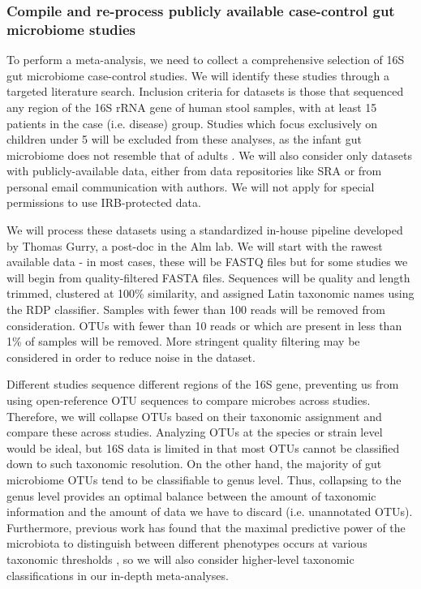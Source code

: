 \documentclass[12pt]{article}
\begin{document}
\subsubsection{Compile and re-process publicly available case-control gut microbiome studies}
To perform a meta-analysis, we need to collect a 
comprehensive selection of 16S gut microbiome case-control studies. We 
will identify these studies through a targeted literature search.  
Inclusion criteria for datasets is those that sequenced
any region of the 16S rRNA gene of human stool samples, with at least 15 patients in the
case (i.e. disease) group. Studies which focus exclusively on 
children under 5 will be excluded from these analyses, as the infant
gut microbiome does not resemble that of adults \cite{lozupone-meta-2013}.
We will also consider only datasets with 
publicly-available data, either from data repositories like SRA or
from personal email communication with authors. We will not 
apply for special permissions to use IRB-protected data. 

We will process these datasets using a standardized in-house pipeline 
developed by Thomas Gurry, a post-doc in the Alm lab. We will 
start with the rawest available data - in most cases, these will be 
FASTQ files but for some studies we will begin from quality-filtered 
FASTA files. Sequences will be quality and length trimmed, clustered 
at 100\% similarity, and assigned Latin taxonomic names using the RDP 
classifier. Samples with fewer than 100 reads will be removed from 
consideration. OTUs with fewer than 10 reads or which are present in 
less than 1\% of samples will be removed. More stringent quality 
filtering may be considered in order to reduce noise in the dataset.

Different studies sequence different regions of the 16S gene,
preventing us from using open-reference OTU sequences to compare
microbes across studies. Therefore, we will collapse OTUs
based on their taxonomic assignment and compare these across studies.
Analyzing OTUs at the species or strain level would be ideal,
but 16S data is limited in that most OTUs cannot be classified
down to such taxonomic resolution. On the other hand, the majority of gut microbiome
OTUs tend to be classifiable to genus level. Thus, collapsing to the genus level 
provides an optimal balance between the amount of taxonomic information and the 
amount of data we have to discard (i.e. unannotated OTUs).
Furthermore, previous work has found that the maximal predictive power of the microbiota
to distinguish between different phenotypes
occurs at various taxonomic thresholds \cite{knights-biomarkers-2011}, so we will
also consider higher-level taxonomic classifications in our in-depth meta-analyses.
\end{document}
